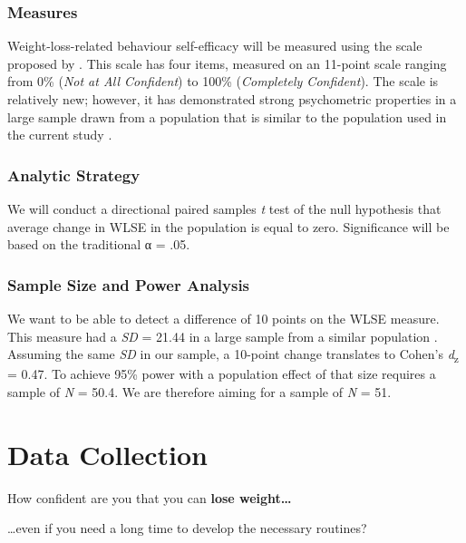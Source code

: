 \documentclass[
]{book}
\begin{document}
\hypertarget{measures-1}{%
\subsubsection{Measures}\label{measures-1}}

Weight-loss-related behaviour self-efficacy will be measured using the scale proposed by \citet{wlse}. This scale has four items, measured on an 11-point scale ranging from 0\% (\emph{Not at All Confident}) to 100\% (\emph{Completely Confident}). The scale is relatively new; however, it has demonstrated strong psychometric properties in a large sample drawn from a population that is similar to the population used in the current study \citep{wlse}.

\hypertarget{analytic-strategy-1}{%
\subsubsection{Analytic Strategy}\label{analytic-strategy-1}}

We will conduct a directional paired samples \emph{t} test of the null hypothesis that average change in WLSE in the population is equal to zero. Significance will be based on the traditional α = .05.

\hypertarget{sample-size-and-power-analysis}{%
\subsubsection{Sample Size and Power Analysis}\label{sample-size-and-power-analysis}}

We want to be able to detect a difference of 10 points on the WLSE measure. This measure had a \emph{SD} = 21.44 in a large sample from a similar population \citep{wlse}. Assuming the same \emph{SD} in our sample, a 10-point change translates to Cohen's \emph{d}\textsubscript{z} = 0.47. To achieve 95\% power with a population effect of that size requires a sample of \emph{N} = 50.4. We are therefore aiming for a sample of \emph{N} = 51.

\hypertarget{pst-data}{%
\section{Data Collection}\label{pst-data}}

How confident are you that you can \textbf{lose weight\ldots{}}

\ldots even if you need a long time to develop the necessary routines?
\end{document}
